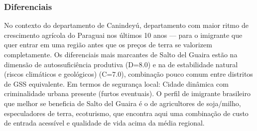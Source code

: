 \subsubsection*{Diferenciais}\label{dif-salto-del-guaira-1401}
No contexto do departamento de Canindeyú, departamento com maior ritmo de crescimento agrícola do Paraguai nos últimos 10 anos — para o imigrante que quer entrar em uma região antes que os preços de terra se valorizem completamente. Os diferenciais mais marcantes de Salto del Guaira estão na dimensão de autossuficiência produtiva (D=8.0) e na de estabilidade natural (riscos climáticos e geológicos) (C=7.0), combinação pouco comum entre distritos de GSS equivalente. Em termos de segurança local: Cidade dinâmica com criminalidade urbana presente (furtos eventuais). O perfil de imigrante brasileiro que melhor se beneficia de Salto del Guaira é o de agricultores de soja/milho, especuladores de terra, ecoturismo, que encontra aqui uma combinação de custo de entrada acessível e qualidade de vida acima da média regional.
